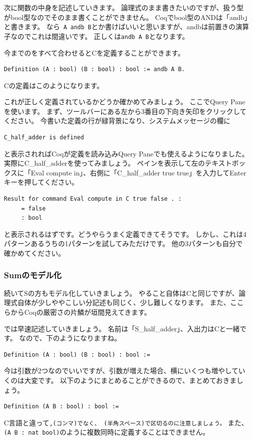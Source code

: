 \documentclass{jsbook}
\begin{document}
次に関数の中身を記述していきます。
論理式のまま書きたいのですが、扱う型がbool型なのでそのまま書くことができません。
Coqでbool型のANDは「andb」と書きます。
なら\verb| A andb B|とか書けばいいと思いますが、andbは前置きの演算子なのでこれは間違いです。
正しくは\verb|andb A B|となります。

今までのをすべて合わせるとCを定義することができます。
\begin{verbatim}
Definition (A : bool) (B : bool) : bool := andb A B.
\end{verbatim}
Cの定義はこのようになります。

これが正しく定義されているかどうか確かめてみましょう。
ここでQuery Paneを使います。
まず、ツールバーにある左から3番目の下向き矢印をクリックしてください。
今書いた定義の行が緑背景になり、システムメッセージの欄に
\begin{verbatim}
C_half_adder is defined
\end{verbatim}
と表示されればCoqが定義を読み込みQuery Paneでも使えるようになりました。
実際にC\_half\_adderを使ってみましょう。
ペインを表示して左のテキストボックスに「Eval compute in」、右側に「C\_half\_adder true true」を入力してEnterキーを押してください。

\begin{verbatim}
Result for command Eval compute in C true false . :
     = false
     : bool
\end{verbatim}
と表示されるはずです。どうやらうまく定義できてそうです。
しかし、これは4パターンあるうちの1パターンを試してみただけです。
他の3パターンも自分で確かめてください。

\subsubsection*{Sumのモデル化}
続いてSの方もモデル化していきましょう。
やること自体はCと同じですが、論理式自体が少しややこしい分記述も同じく、少し難しくなります。
また、ここらからCoqの厳密さの片鱗が垣間見えてきます。

では早速記述していきましょう。
名前は「S\_half\_adder」、入出力はCと一緒です。
なので、下のようになりますね。
\begin{verbatim}
Definition (A : bool) (B : bool) : bool :=
\end{verbatim}
今は引数が2つなのでいいですが、引数が増えた場合、横にいくつも増やしていくのは大変です。
以下のようにまとめることができるので、まとめておきましょう。
\begin{verbatim}
Definition (A B : bool) : bool :=
\end{verbatim}
C言語と違って\verb*|,(コンマ)でなく、 (半角スペース)で区切るのに注意しましょう。|
また、\verb|(A B : nat bool)|のように複数同時に定義することはできません。
\end{document}
